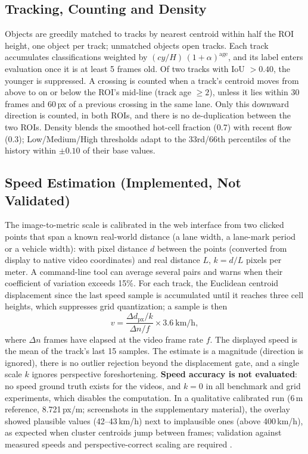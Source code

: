 \documentclass[conference]{IEEEtran}
\begin{document}
\subsection{Tracking, Counting and Density}
\label{sec:tracking}
Objects are greedily matched to tracks by nearest centroid within half
the ROI height, one object per track; unmatched objects open tracks.
Each track accumulates classifications weighted by
$(cy/H)\,(1{+}\alpha)^{\text{age}}$, and its label enters evaluation once
it is at least 5 frames old. Of two tracks with IoU $>0.40$, the younger
is suppressed. A crossing is counted when a track's centroid moves from
above to on or below the ROI's mid-line (track age $\geq 2$), unless it
lies within 30 frames and 60\,px of a previous crossing in the same lane.
Only this downward direction is counted, in both ROIs, and there is no
de-duplication between the two ROIs. Density blends the smoothed hot-cell fraction
(0.7) with recent flow (0.3); Low/Medium/High thresholds adapt to the
33rd/66th percentiles of the history within $\pm0.10$ of their base
values.

\subsection{Speed Estimation (Implemented, Not Validated)}
\label{sec:speed}
The image-to-metric scale is calibrated in the web interface from two
clicked points that span a known real-world distance (a lane width, a
lane-mark period or a vehicle width): with pixel distance $d$ between the
points (converted from display to native video coordinates) and real
distance $L$, $k=d/L$ pixels per meter. A command-line tool can average
several pairs and warns when their coefficient of variation exceeds 15\%.
For each track, the Euclidean centroid displacement since the last speed
sample is accumulated until it reaches three cell heights, which
suppresses grid quantization; a sample is then
\begin{equation}
v=\frac{\Delta d_{\text{px}}/k}{\Delta n/f}\times3.6\ \text{km/h},
\label{eq:speed}
\end{equation}
where $\Delta n$ frames have elapsed at the video frame rate $f$. The
displayed speed is the mean of the track's last 15 samples. The estimate
is a magnitude (direction is ignored), there is no outlier rejection
beyond the displacement gate, and a single scale $k$ ignores perspective
foreshortening. \textbf{Speed accuracy is not evaluated}: no speed ground
truth exists for the videos, and $k=0$ in all benchmark and grid
experiments, which disables the computation. In a qualitative calibrated
run (6\,m reference, 8.721\,px/m; screenshots in the supplementary
material), the overlay showed plausible values (42--43\,km/h) next to
implausible ones (above 400\,km/h), as expected when cluster centroids
jump between frames; validation against measured speeds and
perspective-correct scaling are required \cite{kamil2024,sangsuwan2024}.
\end{document}
